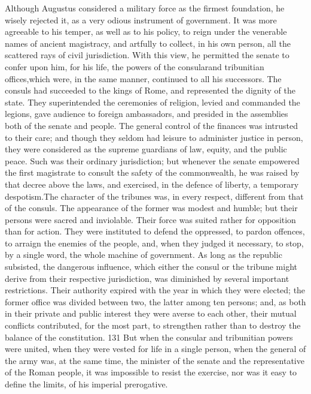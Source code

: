Although Augustus considered a military force as the firmest
foundation, he wisely rejected it, as a very odious instrument of
government. It was more agreeable to his temper, as well as to
his policy, to reign under the venerable names of ancient
magistracy, and artfully to collect, in his own person, all the
scattered rays of civil jurisdiction. With this view, he
permitted the senate to confer upon him, for his life, the powers
of the consular\footnotemark[11] and tribunitian offices,\footnotemark[12] which were, in the
same manner, continued to all his successors. The consuls had
succeeded to the kings of Rome, and represented the dignity of
the state. They superintended the ceremonies of religion, levied
and commanded the legions, gave audience to foreign ambassadors,
and presided in the assemblies both of the senate and people. The
general control of the finances was intrusted to their care; and
though they seldom had leisure to administer justice in person,
they were considered as the supreme guardians of law, equity, and
the public peace. Such was their ordinary jurisdiction; but
whenever the senate empowered the first magistrate to consult the
safety of the commonwealth, he was raised by that decree above
the laws, and exercised, in the defence of liberty, a temporary
despotism.\footnotemark[13] The character of the tribunes was, in every
respect, different from that of the consuls. The appearance of
the former was modest and humble; but their persons were sacred
and inviolable. Their force was suited rather for opposition than
for action. They were instituted to defend the oppressed, to
pardon offences, to arraign the enemies of the people, and, when
they judged it necessary, to stop, by a single word, the whole
machine of government. As long as the republic subsisted, the
dangerous influence, which either the consul or the tribune might
derive from their respective jurisdiction, was diminished by
several important restrictions. Their authority expired with the
year in which they were elected; the former office was divided
between two, the latter among ten persons; and, as both in their
private and public interest they were averse to each other, their
mutual conflicts contributed, for the most part, to strengthen
rather than to destroy the balance of the constitution. 131 But
when the consular and tribunitian powers were united, when they
were vested for life in a single person, when the general of the
army was, at the same time, the minister of the senate and the
representative of the Roman people, it was impossible to resist
the exercise, nor was it easy to define the limits, of his
imperial prerogative.

